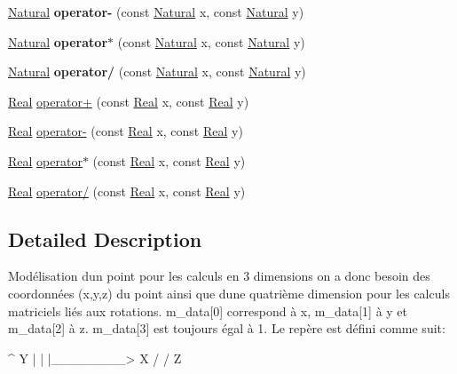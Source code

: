 \begin{DoxyCompactItemize}
\hyperlink{classez_1_1objects_1_1Natural}{Natural} {\bfseries operator-\/} (const \hyperlink{classez_1_1objects_1_1Natural}{Natural} x, const \hyperlink{classez_1_1objects_1_1Natural}{Natural} y)
\item 
\mbox{\label{namespaceez_a68b8625a5c8006c8e8bf4629215f0ce3}} 
\hyperlink{classez_1_1objects_1_1Natural}{Natural} {\bfseries operator$\ast$} (const \hyperlink{classez_1_1objects_1_1Natural}{Natural} x, const \hyperlink{classez_1_1objects_1_1Natural}{Natural} y)
\item 
\mbox{\label{namespaceez_a90eb91eacb48fffb9380e89c54133695}} 
\hyperlink{classez_1_1objects_1_1Natural}{Natural} {\bfseries operator/} (const \hyperlink{classez_1_1objects_1_1Natural}{Natural} x, const \hyperlink{classez_1_1objects_1_1Natural}{Natural} y)
\item 
\hyperlink{classez_1_1objects_1_1Real}{Real} \hyperlink{namespaceez_acf6a709c8dd01fd0f483d0e684a40960}{operator+} (const \hyperlink{classez_1_1objects_1_1Real}{Real} x, const \hyperlink{classez_1_1objects_1_1Real}{Real} y)
\item 
\hyperlink{classez_1_1objects_1_1Real}{Real} \hyperlink{namespaceez_add78c19e69c5e85a255e290fb5beb5c7}{operator-\/} (const \hyperlink{classez_1_1objects_1_1Real}{Real} x, const \hyperlink{classez_1_1objects_1_1Real}{Real} y)
\item 
\hyperlink{classez_1_1objects_1_1Real}{Real} \hyperlink{namespaceez_a904ed5e888a982c0f811c121b3024573}{operator$\ast$} (const \hyperlink{classez_1_1objects_1_1Real}{Real} x, const \hyperlink{classez_1_1objects_1_1Real}{Real} y)
\item 
\hyperlink{classez_1_1objects_1_1Real}{Real} \hyperlink{namespaceez_a69597aa103ea12a5ed7a71411f94bff7}{operator/} (const \hyperlink{classez_1_1objects_1_1Real}{Real} x, const \hyperlink{classez_1_1objects_1_1Real}{Real} y)
\end{DoxyCompactItemize}


\subsection{Detailed Description}
Modélisation d\textquotesingle{}un point pour les calculs en 3 dimensions on a donc besoin des coordonnées (x,y,z) du point ainsi que d\textquotesingle{}une quatrième dimension pour les calculs matriciels liés aux rotations. m\+\_\+data\mbox{[}0\mbox{]} correspond à x, m\+\_\+data\mbox{[}1\mbox{]} à y et m\+\_\+data\mbox{[}2\mbox{]} à z. m\+\_\+data\mbox{[}3\mbox{]} est toujours égal à 1. Le repère est défini comme suit\+: 
\begin{DoxyPre}
    ^ Y
    |
    |
    |\_\_\_\_\_\_\_\_>  X
   /
  /
 Z
 \end{DoxyPre}
 

